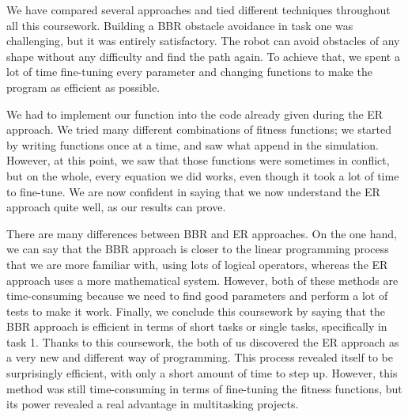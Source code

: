 \documentclass[lettersize,journal]{IEEEtran}
\begin{document}
We have compared several approaches and tied different techniques throughout all this coursework. Building a BBR obstacle avoidance in task one was challenging, but it was entirely satisfactory. The robot can avoid obstacles of any shape without any difficulty and find the path again. To achieve that, we spent a lot of time fine-tuning every parameter and changing functions to make the program as efficient as possible.
\par 
We had to implement our function into the code already given during the ER approach. We tried many different combinations of fitness functions; we started by writing functions once at a time, and saw what append in the simulation. However, at this point, we saw that those functions were sometimes in conflict, but on the whole, every equation we did works, even though it took a lot of time to fine-tune. We are now confident in saying that we now understand the ER approach quite well, as our results can prove.
\par
There are many differences between BBR and ER approaches. On the one hand, we can say that the BBR approach is closer to the linear programming process that we are more familiar with, using lots of logical operators, whereas the ER approach uses a more mathematical system. However, both of these methods are time-consuming because we need to find good parameters and perform a lot of tests to make it work.  Finally, we conclude this coursework by saying that the BBR approach is efficient in terms of short tasks or single tasks, specifically in task 1. Thanks to this coursework, the both of us discovered the ER approach as a very new and different way of programming. This process revealed itself to be surprisingly efficient, with only a short amount of time to step up. However, this method was still time-consuming in terms of fine-tuning the fitness functions, but its power revealed a real advantage in multitasking projects.
\end{document}
